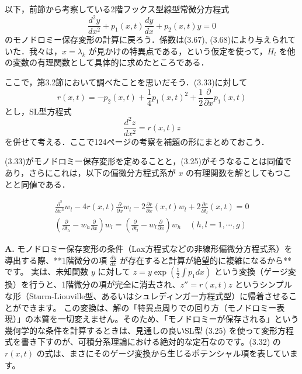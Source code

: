 \begin{story}

以下，前節から考察している2階フックス型線型常微分方程式
\begin{equation}
    \frac{d^2 y}{dx^2} + p_1(x,t) \frac{dy}{dx} + p_2(x,t)y = 0
\end{equation}
のモノドロミー保存変形の計算に戻ろう．係数は(3.67), (3.68)により与えられていた．我々は，$x=\lambda_k$ が見かけの特異点である，という仮定を使って，$H_l$ を他の変数の有理関数として具体的に求めたところである．

ここで，第3.2節において調べたことを思いだそう．(3.33)に対して
\begin{equation}
    r(x,t) = -p_2(x,t) + \frac{1}{4}p_1(x,t)^2 + \frac{1}{2}\frac{\partial}{\partial x}p_1(x,t) \label{eq:3.32}
\end{equation}
とし，SL型方程式
\begin{equation}
    \frac{d^2 z}{dx^2} = r(x,t)z
\end{equation}
を併せて考える．ここで124ページの考察を補題の形にまとめておこう．

\begin{lemma}[3.5]
(3.33)がモノドロミー保存変形を定めることと，(3.25)がそうなることは同値であり，さらにこれは，以下の偏微分方程式系が $x$ の有理関数を解としてもつことと同値である．

\begin{align}
    \frac{\partial^3}{\partial x^3}w_l - 4r(x,t)\frac{\partial}{\partial x}w_l - 2\frac{\partial r}{\partial x}(x,t)w_l + 2\frac{\partial r}{\partial t_l}(x,t) = 0 \label{eq:3.82} \\
    \left( \frac{\partial}{\partial t_h} - w_h \frac{\partial}{\partial x} \right) w_l = \left( \frac{\partial}{\partial t_l} - w_l \frac{\partial}{\partial x} \right) w_h \quad (h,l = 1,\cdots,g) \label{eq:3.83}
\end{align}

\end{lemma}
\end{story}

\begin{Q}
\textbf{A.} モノドロミー保存変形の条件（Lax方程式などの非線形偏微分方程式系）を導出する際、**1階微分の項 $\frac{dy}{dx}$ が存在すると計算が絶望的に複雑になるから**です。
実は、未知関数 $y$ に対して $z = y \exp(\frac{1}{2}\int p_1 dx)$ という変換（ゲージ変換）を行うと、1階微分の項が完全に消去され、$z'' = r(x,t)z$ というシンプルな形（Sturm-Liouville型、あるいはシュレディンガー方程式型）に帰着させることができます。
この変換は、解の「特異点周りでの回り方（モノドロミー表現）」の本質を一切変えません。そのため、「モノドロミーが保存される」という幾何学的な条件を計算するときは、見通しの良いSL型 (3.25) を使って変形方程式を書き下すのが、可積分系理論における絶対的な定石なのです。(3.32) の $r(x,t)$ の式は、まさにそのゲージ変換から生じるポテンシャル項を表しています。
\end{Q}

